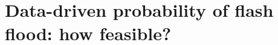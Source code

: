 \chapter{Data-driven probability of flash flood: how feasible?}
\label{feasibility_PoFF}
\graphicspath{{chapter_06/figures}{chapter_06/tables}}

